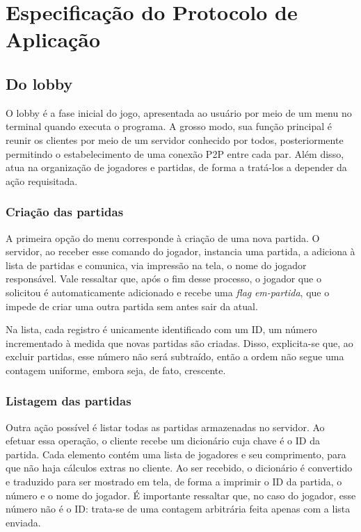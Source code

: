 \documentclass[11pt,a4paper]{article}
\begin{document}
\section{Especificação do Protocolo de Aplicação}

\subsection{Do lobby}

O lobby é a fase inicial do jogo, apresentada ao usuário por meio de um menu no terminal quando executa o programa. A grosso modo, sua função principal é reunir os clientes por meio de um servidor conhecido por todos, posteriormente permitindo o estabelecimento de uma conexão P2P entre cada par. Além disso, atua na organização de jogadores e partidas, de forma a tratá-los a depender da ação requisitada.

\subsubsection{Criação das partidas}

A primeira opção do menu corresponde à criação de uma nova partida. O servidor, ao receber esse comando do jogador, instancia uma partida, a adiciona à lista de partidas e comunica, via impressão na tela, o nome do jogador responsável. Vale ressaltar que, após o fim desse processo, o jogador que o solicitou é automaticamente adicionado e recebe uma \textit{flag} \textit{em-partida}, que o impede de criar uma outra partida sem antes sair da atual. 

Na lista, cada registro é unicamente identificado com um ID, um número incrementado à medida que novas partidas são criadas. Disso, explicita-se que, ao excluir partidas, esse número não será subtraído, então a ordem não segue uma contagem uniforme, embora seja, de fato, crescente.

\subsubsection{Listagem das partidas}

Outra ação possível é listar todas as partidas armazenadas no servidor. Ao efetuar essa operação, o cliente recebe um dicionário cuja chave é o ID da partida. Cada elemento contém uma lista de jogadores e seu comprimento, para que não haja cálculos extras no cliente. Ao ser recebido, o dicionário é convertido e traduzido para ser mostrado em tela, de forma a imprimir o ID da partida, o número e o nome do jogador. É importante ressaltar que, no caso do jogador, esse número não é o ID: trata-se de uma contagem arbitrária feita apenas com a lista enviada.
\end{document}
